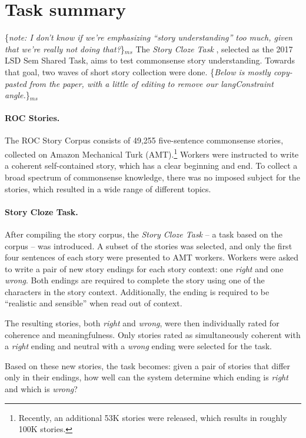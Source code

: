\documentclass[11pt]{article}
\newcommand{\ms}[1]{{\color{cyan}\{\textit{#1}\}$_{ms}$}}
\begin{document}
\section{Task summary}
\ms{note: I don't know if we're emphasizing ``story understanding'' too much, given that we're really not doing that?}
The \textit{Story Cloze Task} \cite{Mostafazadeh:2016}, selected as the 2017 LSD Sem Shared Task, aims to test commonsense story understanding. Towards that goal, two waves of short story collection were done.
\ms{Below is mostly copy-pasted from the paper, with a little of editing to remove our langConstraint angle.}
\paragraph{ROC Stories.}
The ROC Story Corpus consists of 49,255 five-sentence commonsense stories, collected on Amazon Mechanical Turk (AMT).\footnote{Recently, an additional 53K stories were released, which results in roughly 100K stories.}
Workers were instructed to write a coherent self-contained story, which has a clear beginning and end. 
To collect a broad spectrum of commonsense knowledge, there was no imposed subject for the stories,
which resulted in a wide range of different topics.
\paragraph{Story Cloze Task.}
After compiling the story corpus, the {\it Story Cloze Task} -- a task based on the corpus -- was introduced.
A subset of the stories was selected, and only the first four sentences of each story were presented to AMT workers.
Workers were asked to write a pair of new story endings for each story context: one {\it right} and one {\it wrong}.
Both endings are required to complete the story using one of the characters in the story context. 
Additionally,  the ending is required to be ``realistic and sensible'' \cite{Mostafazadeh:2016} when read out of context.

The resulting stories, both {\it right} and {\it wrong}, were then individually rated for coherence and meaningfulness. 
Only stories rated as simultaneously coherent with a {\it right} ending and neutral with a {\it wrong} ending were selected for the task. 

Based on these new stories, the task becomes: given a pair of stories that differ only in their endings, how well can the system determine which ending is {\it right} and which is {\it wrong}?
\end{document}
